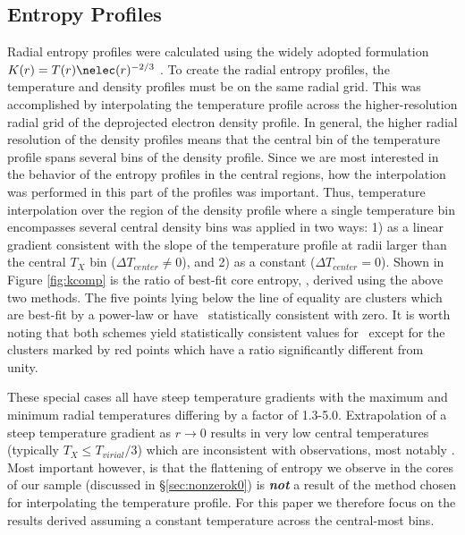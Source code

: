 \documentclass{emulateapj}
\begin{document}
\subsection{Entropy Profiles}
\label{sec:kpr}

Radial entropy profiles were calculated using the widely adopted
formulation $K(r) = T(r)\nelec(r)^{-2/3}$ \cite{davies00}. To create
the radial entropy profiles, the temperature and density profiles must
be on the same radial grid. This was accomplished by interpolating the
temperature profile across the higher-resolution radial grid of the
deprojected electron density profile. In general, the higher radial
resolution of the density profiles means that the central bin of the
temperature profile spans several bins of the density profile. Since
we are most interested in the behavior of the entropy profiles in the
central regions, how the interpolation was performed in this part of
the profiles was important. Thus, temperature interpolation over the
region of the density profile where a single temperature bin
encompasses several central density bins was applied in two ways: 1)
as a linear gradient consistent with the slope of the temperature
profile at radii larger than the central $T_X$ bin ($\Delta T_{center}
\ne 0$), and 2) as a constant ($\Delta T_{center}=0$). Shown in Figure
\ref{fig:kcomp} is the ratio of best-fit core entropy, \kna, derived
using the above two methods. The five points lying below the line of
equality are clusters which are best-fit by a power-law or have
\kna\ statistically consistent with zero. It is worth noting that both
schemes yield statistically consistent values for \kna\ except for the
clusters marked by red points which have a ratio significantly
different from unity.

These special cases all have steep temperature gradients with the
maximum and minimum radial temperatures differing by a factor of
1.3-5.0. Extrapolation of a steep temperature gradient as $r
\rightarrow 0$ results in very low central temperatures (typically
$T_X \leq T_{virial}/3$) which are inconsistent with observations,
most notably \cite{peterson03}. Most important however, is that the
flattening of entropy we observe in the cores of our sample (discussed
in \S\ref{sec:nonzerok0}) is {\bfseries\em{not}} a result of the
method chosen for interpolating the temperature profile. For this
paper we therefore focus on the results derived assuming a constant
temperature across the central-most bins.
\end{document}
